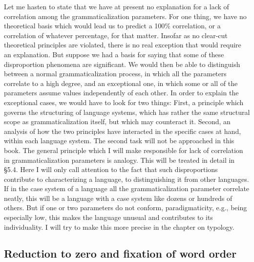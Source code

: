 Let me hasten to state that we have at present no explanation for a lack of correlation among the grammaticalization parameters. For one thing, we have no theoretical basis which would lead us to predict a 100\% correlation, or a correlation of whatever percentage, for that matter. Insofar as no clear-cut theoretical principles are violated, there is no real exception that would require an explanation. But suppose we had a basis for saying that some of these disproportion phenomena are significant. We would then be able to distinguish between a normal grammaticalization process, in which all the parameters correlate to a high degree, and an exceptional one, in which some or all of the parameters assume values independently of each other. In order to explain the exceptional cases, we would have to look for two things: First, a principle which governs the structuring of language systems, which has rather the same structural scope as grammaticalization itself, but which may counteract it. Second, an analysis of how the two principles have interacted in the specific cases at hand, within each language system. The second task will not be approached in this book. The general principle which I will make responsible for lack of correlation in grammaticalization parameters is analogy. This will be treated in detail in §5.4. Here I will only call attention to the fact that such disproportions contribute to characterizing a language, to distinguishing it from other languages. If in the case system of a language all the grammaticalization parameter correlate neatly, this will be a language with a case system like dozens or hundreds of others. But if one or two parameters do not conform, paradigmaticity, e.g., being especially low, this makes the language unusual and contributes to its individuality. I will try to make this more precise in the chapter on typology.

\subsection{Reduction to zero and fixation of word order} \label{sec:4.4.4}


